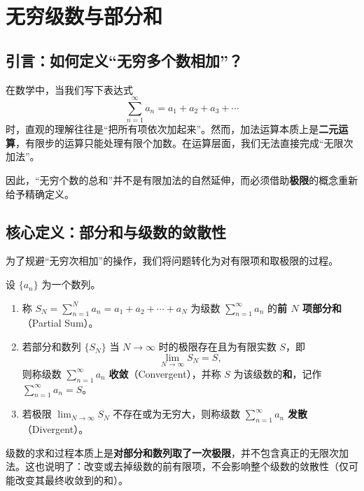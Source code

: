 \section{无穷级数与部分和}
\label{sec:02-Calculus/05-Sequences-and-Series/02}

\subsection{引言：如何定义``无穷多个数相加''？}

在数学中，当我们写下表达式
\[
\sum_{n=1}^{\infty} a_n = a_1 + a_2 + a_3 + \cdots
\]
时，直观的理解往往是``把所有项依次加起来''。然而，加法运算本质上是\textbf{二元运算}，有限步的运算只能处理有限个加数。在运算层面，我们无法直接完成``无限次加法''。

因此，``无穷个数的总和''并不是有限加法的自然延伸，而必须借助\textbf{极限}的概念重新给予精确定义。

\subsection{核心定义：部分和与级数的敛散性}

为了规避``无穷次相加''的操作，我们将问题转化为对有限项和取极限的过程。

\begin{definition}[部分和与级数收敛性]
设 \(\{a_n\}\) 为一个数列。
\begin{enumerate}
    \item 称 \(S_N = \sum_{n=1}^{N} a_n = a_1 + a_2 + \cdots + a_N\) 为级数 \(\sum_{n=1}^{\infty} a_n\) 的\textbf{前 \(N\) 项部分和}（Partial Sum）。
    \item 若部分和数列 \(\{S_N\}\) 当 \(N \to \infty\) 时的极限存在且为有限实数 \(S\)，即
    \[
    \lim_{N \to \infty} S_N = S,
    \]
    则称级数 \(\sum_{n=1}^{\infty} a_n\) \textbf{收敛}（Convergent），并称 \(S\) 为该级数的\textbf{和}，记作 \(\sum_{n=1}^{\infty} a_n = S\)。
    \item 若极限 \(\lim_{N \to \infty} S_N\) 不存在或为无穷大，则称级数 \(\sum_{n=1}^{\infty} a_n\) \textbf{发散}（Divergent）。
\end{enumerate}
\end{definition}

\begin{remark}
级数的求和过程本质上是\textbf{对部分和数列取了一次极限}，并不包含真正的无限次加法。这也说明了：改变或去掉级数的前有限项，不会影响整个级数的敛散性（仅可能改变其最终收敛到的和）。
\end{remark}

